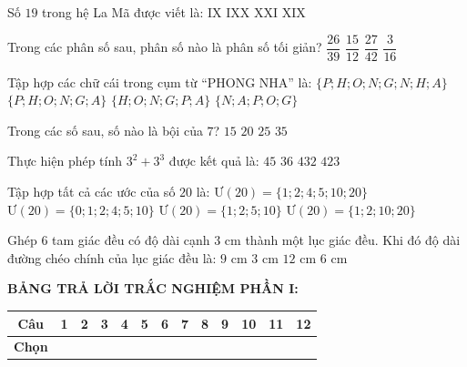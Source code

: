 \documentclass[12pt,a4paper]{article}
\begin{document}
\begin{ex}
Số $19$ trong hệ La Mã được viết là:
\choice
{IX}
{IXX}
{XXI}
{\True XIX}
\end{ex}

\begin{ex}
Trong các phân số sau, phân số nào là phân số tối giản?
\choice
{$\dfrac{26}{39}$}
{$\dfrac{15}{12}$}
{$\dfrac{27}{42}$}
{\True $\dfrac{3}{16}$}
\end{ex}

\begin{ex}
Tập hợp các chữ cái trong cụm từ “PHONG NHA” là:
\choice
{$\{P; H; O; N; G; N; H; A\}$}
{\True $\{P; H; O; N; G; A\}$}
{$\{H; O; N; G; P; A\}$}
{$\{N; A; P; O; G\}$}
\end{ex}

\begin{ex}
Trong các số sau, số nào là bội của $7$?
\choice
{$15$}
{$20$}
{$25$}
{\True $35$}
\end{ex}

\begin{ex}
Thực hiện phép tính $3^2 + 3^3$ được kết quả là:
\choice
{$45$}
{\True $36$}
{$432$}
{$423$}
\end{ex}

\begin{ex}
\end{ex}

\begin{ex}
Tập hợp tất cả các ước của số $20$ là:
\choice
{\True $\text{Ư}(20) = \{1; 2; 4; 5; 10; 20\}$}
{$\text{Ư}(20) = \{0; 1; 2; 4; 5; 10\}$}
{$\text{Ư}(20) = \{1; 2; 5; 10\}$}
{$\text{Ư}(20) = \{1; 2; 10; 20\}$}
\end{ex}

\begin{ex}
Ghép $6$ tam giác đều có độ dài cạnh $3\text{ cm}$ thành một lục giác đều. Khi đó độ dài đường chéo chính của lục giác đều là:
\choice
{$9\text{ cm}$}
{$3\text{ cm}$}
{$12\text{ cm}$}
{\True $6\text{ cm}$}
\end{ex}


\vspace{1mm}
\noindent\textbf{BẢNG TRẢ LỜI TRẮC NGHIỆM PHẦN I:}
\begin{center}
\begin{tabular}{|c|c|c|c|c|c|c|c|c|c|c|c|c|}
\hline
\textbf{Câu} & \textbf{1} & \textbf{2} & \textbf{3} & \textbf{4} & \textbf{5} & \textbf{6} & \textbf{7} & \textbf{8} & \textbf{9} & \textbf{10} & \textbf{11} & \textbf{12} \\
\hline
\textbf{Chọn} & \rule{0pt}{0.65cm} & & & & & & & & & & & \\
\hline
\end{tabular}
\end{center}
\vspace{2mm}
\end{document}
